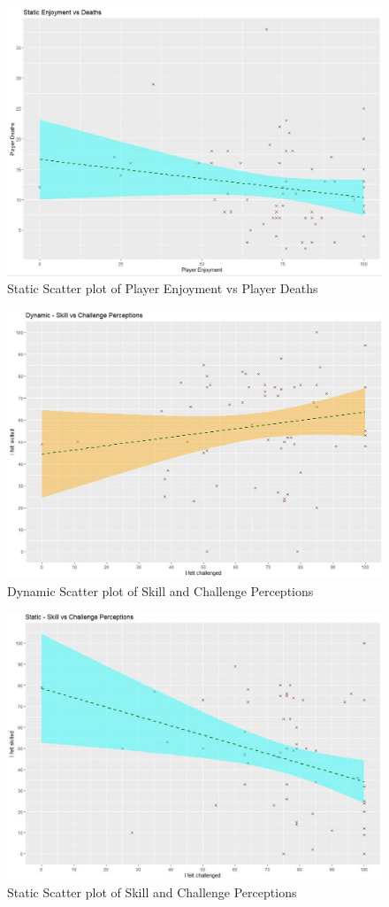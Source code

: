\documentclass[journal]{IEEEtran}
\begin{document}
\begin{figure}[h]
	\includegraphics[width=0.75\linewidth]{staticfundeath.jpg}
	\caption{Static Scatter plot of Player Enjoyment vs Player Deaths}
	\label{fig::14}
\end{figure}

\begin{figure}[h]
	\includegraphics[width=0.75\linewidth]{dynamicchallengevsskilled.jpg}
	\caption{Dynamic Scatter plot of Skill and Challenge Perceptions}
	\label{fig::15}
\end{figure} 

\begin{figure}[h]
	\includegraphics[width=0.75\linewidth]{staticchallengevsskilled.jpg}
	\caption{Static Scatter plot of Skill and Challenge Perceptions}
	\label{fig::16}
\end{figure} 
\end{document}
